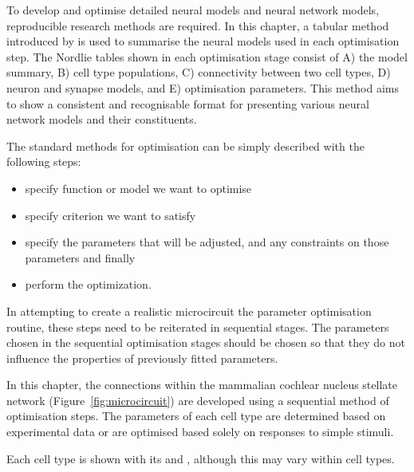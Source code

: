 
To develop and optimise detailed neural models and neural network models, reproducible research methods are required. In this chapter, a tabular method introduced by \citet{NordlieGewaltigEtAl:2009} is used to summarise the neural models used in each optimisation step.
The Nordlie tables shown in each optimisation stage consist of A) the model summary, B) cell type populations, C) connectivity between two cell types, D) neuron and synapse models, and E) optimisation parameters.
This method aims to show a consistent and recognisable format for presenting various neural network models and their constituents.


The standard methods for optimisation can be simply described with the following
steps:\begin{itemize}
\item specify function or model we want to optimise
\item specify criterion we want to satisfy
\item specify the parameters that will be adjusted,
  and any constraints on those parameters and finally
\item perform the optimization.
\end{itemize}
In attempting to create a realistic microcircuit the parameter optimisation routine, these steps need to be reiterated in sequential stages.
The parameters chosen in the sequential optimisation stages should be chosen so that they do not influence the properties of previously fitted parameters.


In this chapter, the connections within the mammalian cochlear nucleus stellate network (Figure~\ref{fig:microcircuit}) are developed using a sequential method of optimisation steps.
The parameters of each cell type are determined based on experimental data or are optimised based solely on responses to simple stimuli.

Each cell type is shown with its \EIRA and \PSTH, although this may vary within cell types.

